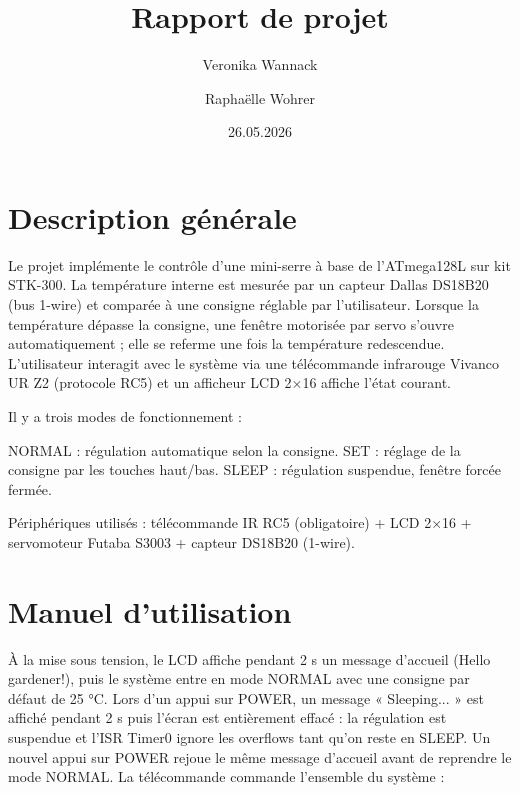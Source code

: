 \documentclass[11pt]{article}
\begin{document}
\title{Rapport de projet}
\author{Veronika Wannack \and Raphaëlle Wohrer}
\date{26.05.2026}
\maketitle

\section{Description générale}

Le projet implémente le contrôle d'une mini-serre à base de l'ATmega128L sur kit STK-300. La température interne est mesurée par un capteur Dallas DS18B20 (bus 1-wire) et comparée à une consigne réglable par l'utilisateur. Lorsque la température dépasse la consigne, une fenêtre motorisée par servo s'ouvre automatiquement ; elle se referme une fois la température redescendue. L'utilisateur interagit avec le système via une télécommande infrarouge Vivanco UR Z2 (protocole RC5) et un afficheur LCD 2×16 affiche l'état courant.

Il y a trois modes de fonctionnement :

NORMAL : régulation automatique selon la consigne.
SET : réglage de la consigne par les touches haut/bas.
SLEEP : régulation suspendue, fenêtre forcée fermée.

Périphériques utilisés : télécommande IR RC5 (obligatoire) + LCD 2×16 + servomoteur Futaba S3003 + capteur DS18B20 (1-wire). 



  

\section{Manuel d'utilisation}


À la mise sous tension, le LCD affiche pendant 2 s un message d'accueil (Hello gardener!), puis le système entre en mode NORMAL avec une consigne par défaut de 25 °C. Lors d'un appui sur POWER, un message « Sleeping... » est affiché pendant 2 s puis l'écran est entièrement effacé : la régulation est suspendue et l'ISR Timer0 ignore les overflows tant qu'on reste en SLEEP. Un nouvel appui sur POWER rejoue le même message d'accueil avant de reprendre le mode NORMAL. La télécommande commande l'ensemble du système :
\end{document}
